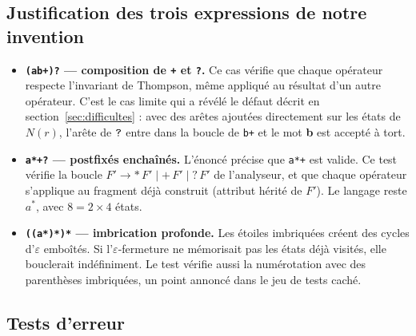 \documentclass[12pt,a4paper]{article}
\newcommand{\code}[1]{{\fontsize{10}{12}\selectfont\texttt{#1}}}
\newcommand{\eps}{\ensuremath{\varepsilon}}
\newcommand{\tok}[1]{\ensuremath{\text{\fontsize{10}{12}\selectfont\ttfamily #1}}}
\begin{document}
\subsection{Justification des trois expressions de notre invention}

\begin{itemize}
\item \textbf{\texttt{(ab+)?} --- composition de \texttt{+} et \texttt{?}.} Ce cas vérifie que
  chaque opérateur respecte l'invariant de Thompson, même appliqué au résultat d'un autre
  opérateur. C'est le cas limite qui a révélé le défaut décrit en
  section~\ref{sec:difficultes} : avec des arêtes ajoutées directement sur les états de $N(r)$,
  l'arête de \tok{?} entre dans la boucle de \code{b+} et le mot \textbf{b} est accepté à tort.
\item \textbf{\texttt{a*+?} --- postfixés enchaînés.} L'énoncé précise que \code{a*+} est
  valide. Ce test vérifie la boucle
  $F' \to \texttt{*}\,F' \mid \texttt{+}\,F' \mid \texttt{?}\,F'$ de l'analyseur, et que chaque
  opérateur s'applique au fragment déjà construit (attribut hérité de $F'$). Le langage reste
  $a^*$, avec $8 = 2 \times 4$ états.
\item \textbf{\texttt{((a*)*)*} --- imbrication profonde.} Les étoiles imbriquées créent des
  cycles d'\eps{} emboîtés. Si l'\eps-fermeture ne mémorisait pas les états déjà visités, elle
  bouclerait indéfiniment. Le test vérifie aussi la numérotation avec des parenthèses
  imbriquées, un point annoncé dans le jeu de tests caché.
\end{itemize}

\subsection{Tests d'erreur}
\end{document}
